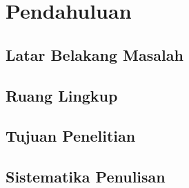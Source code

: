     \newpage

    

    {\centering
        \renewcommand{\thesection}{\arabic{section}.}
        \section{Pendahuluan}
    }

    \subsection{Latar Belakang Masalah}

    \subsection{Ruang Lingkup}

    \subsection{Tujuan Penelitian}

    \subsection{Sistematika Penulisan}

